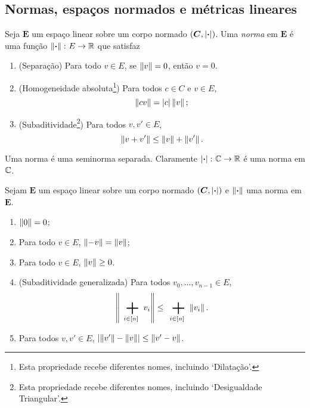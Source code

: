 \subsection{Normas, espaços normados e métricas lineares}

\begin{definition}
Seja $\bm E$ um espaço linear sobre um corpo normado $(\bm C,\left\vert{\bm{\cdot}}\right\vert)$. Uma \emph{norma} em $\bm E$ é uma função $\left\Vert{\bm{\cdot}}\right\Vert\colon E \to \mathbb{R}$
que satisfaz
	\begin{enumerate}
	\item (Separação) Para todo $v \in E$, se $\left\Vert{v}\right\Vert=0$, então $v=0$.
	\item (Homogeneidade absoluta\footnote{Esta propriedade recebe diferentes nomes, incluindo `Dilatação'.}) Para todos $c \in C$ e $v \in E$,
		\begin{equation*}
		\left\Vert{cv}\right\Vert = \left\vert{c}\right\vert\left\Vert{v}\right\Vert;
		\end{equation*}
	\item (Subaditividade\footnote{Esta propriedade recebe diferentes nomes, incluindo `Desigualdade Triangular'.}) Para todos $v,v' \in E$,
		\begin{equation*}
		\left\Vert{v + v'}\right\Vert \leq \left\Vert{v}\right\Vert + \left\Vert{v'}\right\Vert.
		\end{equation*}
	\end{enumerate}
\end{definition}

Uma norma é uma seminorma separada. Claramente $\left\vert{\bm{\cdot}}\right\vert\colon \mathbb{C} \to \mathbb{R}$ é uma norma em $\mathbb{C}$.

\begin{proposition}
Sejam $\bm E$ um espaço linear sobre um corpo normado $(\bm C,\left\vert{\bm{\cdot}}\right\vert)$ e $\left\Vert{\bm{\cdot}}\right\Vert$ uma norma em $\bm E$.
	\begin{enumerate}
	\item $\left\Vert{0}\right\Vert=0$;
	\item Para todo $v \in E$, $\left\Vert{-v}\right\Vert=\left\Vert{v}\right\Vert$;
	\item Para todo $v \in E$, $\left\Vert{v}\right\Vert \geq 0$.
	\item (Subaditividade generalizada) Para todos $v_0,\dots,v_{n-1} \in E$,
		\begin{equation*}
		\nor{\sum_{i \in [n]} v_i} \leq \sum_{i \in [n]} \nor{v_i}.
		\end{equation*}
	\item Para todos $v,v' \in E$, $\left\vert{\left\Vert{v'}\right\Vert-\left\Vert{v}\right\Vert}\right\vert \leq \left\Vert{v'-v}\right\Vert$.
	\end{enumerate}
\end{proposition}

